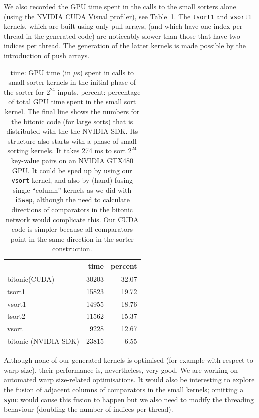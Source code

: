 We also recorded the GPU time spent in the calls to the small sorters alone (using the NVIDIA CUDA Visual profiler), see Table~\ref{tab:expressive-table2}.
The {\tt tsort1} and {\tt vsort1} kernels, which are built using only pull arrays, 
(and which have one index per thread in the generated code) are
noticeably slower than those that have two indices per thread.
The generation of the latter kernels is made possible by the introduction of 
push arrays.

%
\begin{table}
\begin{center}
  \begin{tabular}{| l | r | r |   }

    \hline
                              & time & percent \\ \hline
    bitonic(CUDA)             & 30203 & 32.07\\
    tsort1                    & 15823 & 19.72  \\
    vsort1                       & 14955 & 18.76 \\ 
    tsort2                      & 11562 & 15.37    \\ 
    vsort                       & 9228 &  12.67 \\ 
    bitonic (NVIDIA SDK)        & 23815 & 6.55 \\
    \hline
  \end{tabular}
\end{center}
\caption{time: GPU time (in $\mu$s) spent in calls to small sorter kernels 
in the initial phase of the sorter for $2^{24}$ inputs. percent: percentage 
of total GPU time spent in the small sort kernel.
The final line shows the numbers for the bitonic code (for large sorts) that 
is distributed with the the NVIDIA SDK. Its structure also starts with a phase 
of small sorting kernels. It takes 274 ms to sort $2^{24}$ key-value pairs on 
an NVIDIA GTX480 GPU. It could be sped up by using our {\tt vsort} kernel, 
and also by (hand) fusing single ``column'' kernels as we did with {\tt iSwap}, 
although the need to calculate directions of comparators in the bitonic network 
would complicate this. Our CUDA code is simpler because all comparators
point in the same direction in the sorter construction.
} 
\label{tab:expressive-table2}
\end{table}


Although none of our generated kernels is optimised (for example with respect to warp size), 
their performance is, nevertheless, very good. We are working on automated warp size-related 
optimisations. It would also be interesting to explore the fusion of adjacent columns of 
comparators in the small kernels; omitting a {\tt sync} would cause this fusion to happen
but we also need to modify the threading behaviour (doubling the number of indices per thread).


